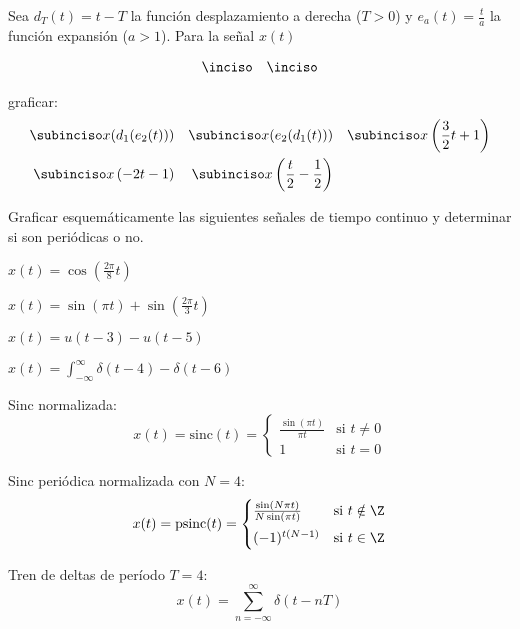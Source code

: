 
\begin{ejercicio}
    Sea $d_T(t)=t-T$ la función desplazamiento a derecha ($T>0$) y $e_a(t)=\frac{t}{a}$ la función expansión ($a > 1$). Para la señal $x(t)$
    
    \begin{align*}
        \inciso \parbox{.3\textwidth}{} & \hfill & \inciso \parbox{.3\textwidth}{}    
    \end{align*}
   
    graficar:
    \begin{align*}
        \subinciso x(d_1(e_2(t))) & \hfill & \subinciso x(e_2(d_1(t))) & \hfill & \subinciso x\left(\frac{3}{2}t + 1\right) \\  \subinciso x\left(-2t -1\right) & \hfill & \subinciso x\left(\frac{t}{2} - \frac{1}{2} \right) & & \hfill
    \end{align*}
    
\end{ejercicio}

\begin{ejercicio}
    Graficar esquemáticamente las siguientes señales de tiempo continuo y determinar si son periódicas o no.

    \inciso $x(t) = \cos(\frac{2\pi}{8} t)$

    \inciso $x(t) = \sin(\pi t) + \sin(\frac{2\pi}{3} t)$

    \inciso $x(t) = u(t-3) - u(t-5)$

    \inciso $x(t) = \int_{-\infty}^{\infty} \delta(t-4) - \delta(t-6)$

    \inciso Sinc normalizada: \begin{equation*}
        x(t) = \mathrm{sinc}(t) = 
        \begin{cases}
            \frac{\sin(\pi t)}{\pi t}    & \mbox{si } t \neq 0 \\[0.5em]
            1 & \mbox{si } t = 0    
        \end{cases}
    \end{equation*}

    \inciso Sinc periódica normalizada con $N=4$: \begin{equation*}
        x(t) = \mathrm{psinc}(t) = \begin{cases}
             \frac{\sin(N \pi t)}{N \sin(\pi t)} & \mbox{si } t \notin \Z \\[0.5em]
            (-1)^{t(N-1)} & \mbox{si } t \in \Z
        \end{cases}
    \end{equation*}

    \inciso Tren de deltas de período $T=4$:
    \begin{equation*}
        x(t) = \sum_{n=-\infty}^{\infty} \delta(t-nT)
    \end{equation*}
\end{ejercicio}

